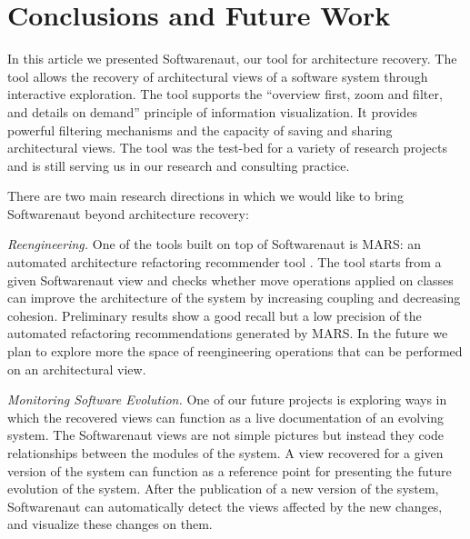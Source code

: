 \documentclass[preprint,12pt]{elsarticle}
\begin{document}





\newpage
\section {Conclusions and Future Work}
\label {sec:conc}

In this article we presented Softwarenaut, our tool for architecture recovery. The tool allows the recovery of architectural views of a software system through interactive exploration. The tool supports the ``overview first, zoom and filter, and details on demand'' principle of information visualization. It provides powerful filtering mechanisms and the capacity of saving and sharing architectural views. The tool was the test-bed for a variety of research projects and is still serving us in our research and consulting practice. 

There are two main research directions in which we would like to bring Softwarenaut beyond architecture recovery:

\begin{description}

\item {\em Reengineering.}
One of the tools built on top of Softwarenaut is MARS: an automated architecture refactoring recommender tool \cite{boeckmann-mars}. The tool starts from a given Softwarenaut view and checks whether move operations applied on classes can improve the architecture of the system by increasing coupling and decreasing cohesion. Preliminary results show a good recall but a low precision of the  automated refactoring recommendations generated by MARS. In the future we plan to explore more the space of reengineering operations that can be performed on an architectural view.


\item {\em Monitoring Software Evolution.}
One of our future projects is exploring ways in which the recovered views can function as a live documentation of an evolving system. The Softwarenaut views are not simple pictures but instead they code relationships between the modules of the system. A view recovered for a given version of the system can function as a reference point for presenting the future evolution of the system. After the publication of a new version of the system, Softwarenaut can automatically detect the views affected by the new changes, and visualize these changes on them.

\end{description}
\end{document}
